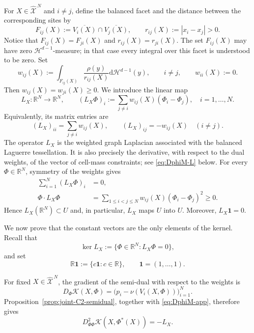 \documentclass[11pt]{article}
\def\R{\mathbb{R}}
\def\Xc{{\mathcal X}}
\def\hX{\widehat{\Xc}^{\,N}}
\newcommand{\dd}{\mathrm{d}}
\newcommand{\HH}{\mathcal H}
\newcommand{\one}{\mathbf 1}
\newcommand{\Kant}{\mathscr K}
\theoremstyle{definition}
\theoremstyle{remark}
\numberwithin{equation}{section}
\begin{document}
For $X\in\hX$ and $i\ne j$, define the balanced facet and the distance between the corresponding
sites by
\begin{equation}\label{eq:facets-main}
 F_{ij}(X):=\overline{V_i(X)}\cap\overline{V_j(X)},
 \qquad
 r_{ij}(X):=|x_i-x_j|>0.
\end{equation}
Notice that $F_{ij}(X)=F_{ji}(X)$ and $r_{ij}(X)=r_{ji}(X)$.  The set
$F_{ij}(X)$ may have zero $\HH^{d-1}$-measure; in that case every integral over this facet is
understood to be zero.  Set
\begin{equation}\label{eq:facet-weights-main}
 w_{ij}(X):=\int_{F_{ij}(X)}\frac{\rho(y)}{r_{ij}(X)}\dd\HH^{d-1}(y),
 \qquad i\ne j,
 \qquad
 w_{ii}(X):=0.
\end{equation}
Then $w_{ij}(X)=w_{ji}(X)\ge0$.  We introduce the linear map
\begin{equation}\label{eq:L-main}
 L_X:\R^N\longrightarrow\R^N,
 \qquad
 (L_X\Phi)_i:=\sum_{j\ne i}w_{ij}(X)(\Phi_i-\Phi_j),
 \quad i=1,\ldots,N.
\end{equation}
Equivalently, its matrix entries are
\begin{equation}\label{eq:L-matrix-main}
 (L_X)_{ii}=\sum_{j\ne i}w_{ij}(X),
 \qquad
 (L_X)_{ij}=-w_{ij}(X)\quad(i\ne j).
\end{equation}
The operator $L_X$ is the weighted graph Laplacian associated with the
balanced Laguerre tessellation.  It is also precisely the derivative,
with respect to the dual weights, of the vector of cell-mass
constraints; see \eqref{eq:DphiM-L} below.  For every
$\Phi\in\R^N$, symmetry of the weights gives
\begin{align}
 \sum_{i=1}^N(L_X\Phi)_i&=0,
 \label{eq:L-range-U-main}\\
 \Phi\cdot L_X\Phi
 &=\sum_{1\le i<j\le N}
 w_{ij}(X)(\Phi_i-\Phi_j)^2
 \ge0.
 \label{eq:L-quadratic-main}
\end{align}
Hence $L_X(\R^N)\subset U$ and, in particular, $L_X$ maps
$U$ into $U$.  Moreover, $L_X\one=0$.

We now prove that the constant vectors are the only elements of the
kernel.  Recall that
\begin{equation}\label{eq:kernel-definition-main}
 \ker L_X:=\{\Phi\in\R^N:L_X\Phi=0\},
\end{equation}
and set
\begin{equation}\label{eq:Rone-definition-main}
 \R\one:=\{c\one:c\in\R\},
 \qquad
 \one=(1,\ldots,1).
\end{equation}

For fixed $X\in\hX$, the gradient of the semi-dual with respect to the
weights is
\[
 D_\Phi\Kant(X,\Phi)
 =
 \bigl(p_i-\nu(V_i(X,\Phi))\bigr)_{i=1}^N.
\]
Proposition~\ref{prop:joint-C2-semidual}, together with
\eqref{eq:DphiM-app}, therefore gives
\begin{equation}\label{eq:weight-Hessian-Laplacian}
 D_{\Phi\Phi}^2\Kant(X,\Phi^*(X))
 =
 -L_X.
\end{equation}
\end{document}
